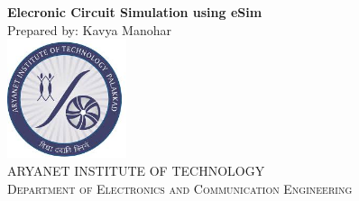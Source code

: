 \begin{titlepage}

\begin{center}
\Large{{\textbf{Elecronic Circuit Simulation using eSim}}}\\[2cm]
{Prepared by: Kavya Manohar}\\[4cm]
\includegraphics[height=3.5cm,width=3.5cm]{AITlogo.jpg}\\[3cm]
\textsc{\Large {ARYANET INSTITUTE OF TECHNOLOGY}}~\\[.5cm]
{\textsc{\Large {Department of Electronics and Communication Engineering}}}\\
\end{center}
\end{titlepage}
